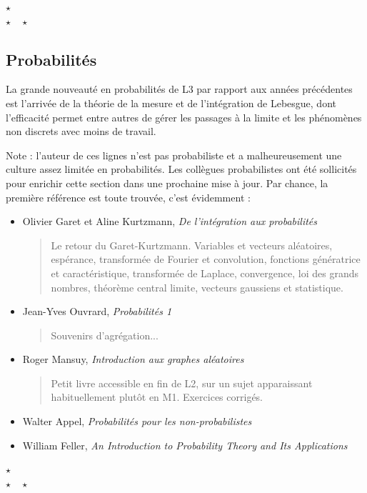 \documentclass{article}
\def\separateur{\begin{center}
$\star$\\
$\star\quad\star$
\end{center}}
\begin{document}
\separateur
\subsection{Probabilités}


La grande nouveauté en probabilités de L3 par rapport aux années précédentes est l'arrivée de la théorie de la mesure et de l'intégration de Lebesgue, dont l'efficacité permet entre autres de gérer les passages à la limite et les phénomènes non discrets avec moins de travail.


Note : l'auteur de ces lignes n'est pas probabiliste et a malheureusement une culture assez limitée en probabilités. Les collègues probabilistes ont été sollicités pour enrichir cette section dans une prochaine mise à jour. Par chance, la première référence est toute trouvée, c'est évidemment : 

\begin{mdframed}
\begin{itemize}
\item Olivier Garet et Aline Kurtzmann, \emph{De l'intégration aux probabilités}
\begin{quote}
Le retour du Garet-Kurtzmann. Variables et vecteurs aléatoires, espérance, transformée de Fourier et convolution, fonctions génératrice et caractéristique, transformée de Laplace, convergence, loi des grands nombres, théorème central limite, vecteurs gaussiens et statistique.
\end{quote}
\end{itemize}
\end{mdframed}

\begin{itemize}
\item Jean-Yves Ouvrard, \emph{Probabilités 1}
\begin{quote}
Souvenirs d'agrégation...
\end{quote}
\item Roger Mansuy, \emph{Introduction aux graphes aléatoires}
\begin{quote}
Petit livre accessible en fin de L2, sur un sujet apparaissant habituellement plutôt en M1. Exercices corrigés.
\end{quote}
\item Walter Appel, \emph{Probabilités pour les non-probabilistes}
\item William Feller, \emph{An Introduction to Probability Theory and Its Applications}
\end{itemize}

\separateur
\newpage
\end{document}
